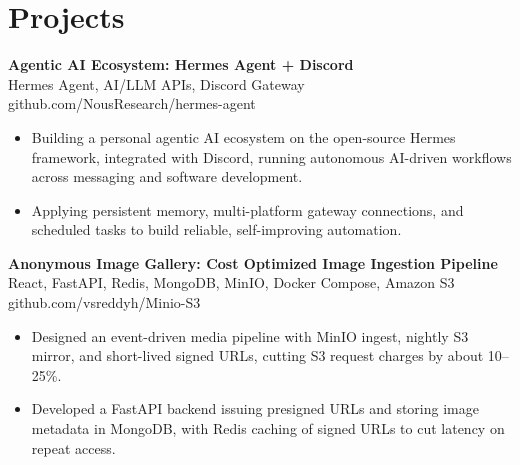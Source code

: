 \documentclass[a4paper,11pt]{article}
\newcommand{\resumeItem}[1]{\item \small{#1}}
\newcommand{\resumeSubheading}[4]{%
  \textbf{#1} \hfill \textbf{#2} \\
{#3} \hfill {#4}
}
\newcommand{\resumeSubHeadingListStart}{\begin{itemize}}
\newcommand{\resumeSubHeadingListEnd}{\end{itemize}}
\begin{document}
\section*{Projects}

\resumeSubheading
{Agentic AI Ecosystem: Hermes Agent + Discord}{}{Hermes Agent, AI/LLM APIs, Discord Gateway}{github.com/NousResearch/hermes-agent}
\resumeSubHeadingListStart
\resumeItem{Building a personal agentic AI ecosystem on the open-source Hermes framework, integrated with Discord, running autonomous AI-driven workflows across messaging and software development.}
\resumeItem{Applying persistent memory, multi-platform gateway connections, and scheduled tasks to build reliable, self-improving automation.}
\resumeSubHeadingListEnd

\resumeSubheading
{Anonymous Image Gallery: Cost Optimized Image Ingestion Pipeline}{}{React, FastAPI, Redis, MongoDB, MinIO, Docker Compose, Amazon S3}{github.com/vsreddyh/Minio-S3}
\resumeSubHeadingListStart
\resumeItem{Designed an event-driven media pipeline with MinIO ingest, nightly S3 mirror, and short-lived signed URLs, cutting S3 request charges by about 10--25\%.}
\resumeItem{Developed a FastAPI backend issuing presigned URLs and storing image metadata in MongoDB, with Redis caching of signed URLs to cut latency on repeat access.}
\resumeSubHeadingListEnd


\vspace{-0.6em}
\end{document}

